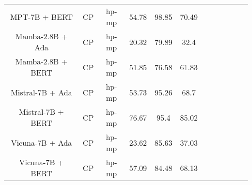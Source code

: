 \begin{table}
\begin{tabular}{|c|c|c|c|c|c|c|c|c|c|c|c|}
	MPT-7B + BERT  & CP & hp-mp  &  54.78 &  98.85 & 70.49  \\
	Mamba-2.8B + Ada  & CP & hp-mp  &  20.32 &  79.89 & 32.4  \\
	Mamba-2.8B + BERT  & CP & hp-mp  &  51.85 &  76.58 & 61.83  \\
	Mistral-7B + Ada  & CP & hp-mp  &  53.73 &  95.26 & 68.7  \\
	Mistral-7B + BERT  & CP & hp-mp  &  76.67 &  95.4 & 85.02  \\
	Vicuna-7B + Ada  & CP & hp-mp  &  23.62 &  85.63 & 37.03  \\
	Vicuna-7B + BERT  & CP & hp-mp  &  57.09 &  84.48 & 68.13  \\
	\hline
\end{tabular}
    \end{table}

